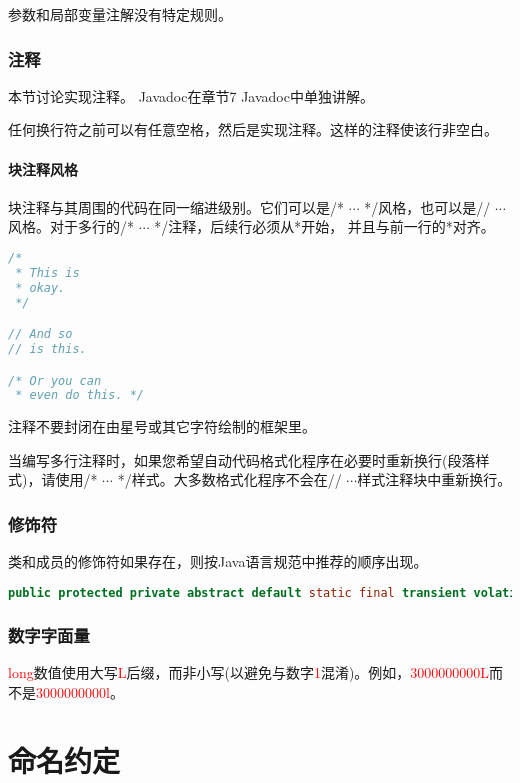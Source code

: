 \documentclass[cn,11pt,chinese]{elegantbook}
\begin{document}
参数和局部变量注解没有特定规则。

\subsection{注释}
本节讨论实现注释。 Javadoc在章节7 Javadoc中单独讲解。

任何换行符之前可以有任意空格，然后是实现注释。这样的注释使该行非空白。

\subsubsection{块注释风格}
块注释与其周围的代码在同一缩进级别。它们可以是/* $\cdots$ */风格，也可以是// $\cdots$风格。对于多行的/* $\cdots$ */注释，后续行必须从*开始， 并且与前一行的*对齐。
\begin{lstlisting}[language=java]
/*
 * This is
 * okay.
 */

// And so
// is this.

/* Or you can
 * even do this. */
\end{lstlisting}

注释不要封闭在由星号或其它字符绘制的框架里。

\begin{remark}
	当编写多行注释时，如果您希望自动代码格式化程序在必要时重新换行(段落样式)，请使用/* $\cdots$ */样式。大多数格式化程序不会在// $\cdots$样式注释块中重新换行。
\end{remark}

\subsection{修饰符}
类和成员的修饰符如果存在，则按Java语言规范中推荐的顺序出现。
\begin{lstlisting}[language=java]
public protected private abstract default static final transient volatile synchronized native strictfp
\end{lstlisting}

\subsection{数字字面量}
\textcolor{red}{long}数值使用大写\textcolor{red}{L}后缀，而非小写(以避免与数字\textcolor{red}{1}混淆)。例如，\textcolor{red}{3000000000L}而不是\textcolor{red}{3000000000l}。

\chapter{命名约定}
\end{document}

